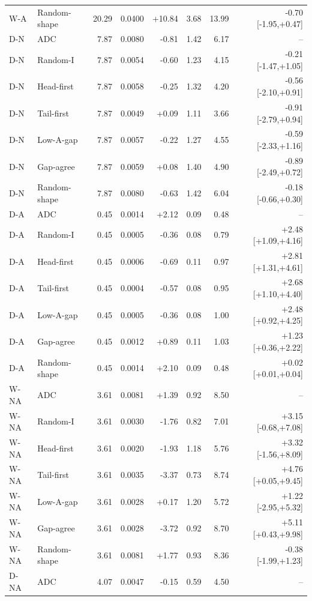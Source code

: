 \begin{table}[htbp]
\begin{tabular}{llrrrrrr}
W-A & Random-shape & 20.29 & 0.0400 & +10.84 & 3.68 & 13.99 & -0.70 [-1.95,+0.47]\\
D-N & ADC & 7.87 & 0.0080 & -0.81 & 1.42 & 6.17 & --\\
D-N & Random-I & 7.87 & 0.0054 & -0.60 & 1.23 & 4.15 & -0.21 [-1.47,+1.05]\\
D-N & Head-first & 7.87 & 0.0058 & -0.25 & 1.32 & 4.20 & -0.56 [-2.10,+0.91]\\
D-N & Tail-first & 7.87 & 0.0049 & +0.09 & 1.11 & 3.66 & -0.91 [-2.79,+0.94]\\
D-N & Low-A-gap & 7.87 & 0.0057 & -0.22 & 1.27 & 4.55 & -0.59 [-2.33,+1.16]\\
D-N & Gap-agree & 7.87 & 0.0059 & +0.08 & 1.40 & 4.90 & -0.89 [-2.49,+0.72]\\
D-N & Random-shape & 7.87 & 0.0080 & -0.63 & 1.42 & 6.04 & -0.18 [-0.66,+0.30]\\
D-A & ADC & 0.45 & 0.0014 & +2.12 & 0.09 & 0.48 & --\\
D-A & Random-I & 0.45 & 0.0005 & -0.36 & 0.08 & 0.79 & +2.48 [+1.09,+4.16]\\
D-A & Head-first & 0.45 & 0.0006 & -0.69 & 0.11 & 0.97 & +2.81 [+1.31,+4.61]\\
D-A & Tail-first & 0.45 & 0.0004 & -0.57 & 0.08 & 0.95 & +2.68 [+1.10,+4.40]\\
D-A & Low-A-gap & 0.45 & 0.0005 & -0.36 & 0.08 & 1.00 & +2.48 [+0.92,+4.25]\\
D-A & Gap-agree & 0.45 & 0.0012 & +0.89 & 0.11 & 1.03 & +1.23 [+0.36,+2.22]\\
D-A & Random-shape & 0.45 & 0.0014 & +2.10 & 0.09 & 0.48 & +0.02 [+0.01,+0.04]\\
W-NA & ADC & 3.61 & 0.0081 & +1.39 & 0.92 & 8.50 & --\\
W-NA & Random-I & 3.61 & 0.0030 & -1.76 & 0.82 & 7.01 & +3.15 [-0.68,+7.08]\\
W-NA & Head-first & 3.61 & 0.0020 & -1.93 & 1.18 & 5.76 & +3.32 [-1.56,+8.09]\\
W-NA & Tail-first & 3.61 & 0.0035 & -3.37 & 0.73 & 8.74 & +4.76 [+0.05,+9.45]\\
W-NA & Low-A-gap & 3.61 & 0.0028 & +0.17 & 1.20 & 5.72 & +1.22 [-2.95,+5.32]\\
W-NA & Gap-agree & 3.61 & 0.0028 & -3.72 & 0.92 & 8.70 & +5.11 [+0.43,+9.98]\\
W-NA & Random-shape & 3.61 & 0.0081 & +1.77 & 0.93 & 8.36 & -0.38 [-1.99,+1.23]\\
D-NA & ADC & 4.07 & 0.0047 & -0.15 & 0.59 & 4.50 & --\\

\end{tabular}
\end{table}
